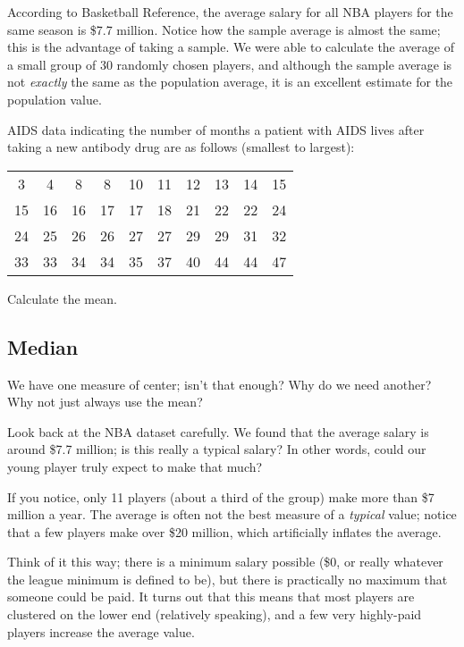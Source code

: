 According to Basketball Reference, the average salary for all NBA players for the same season is \$7.7 million.  Notice how the sample average is almost the same; this is the advantage of taking a sample.  We were able to calculate the average of a small group of 30 randomly chosen players, and although the sample average is not \emph{exactly} the same as the population average, it is an excellent estimate for the population value.

\begin{try}
AIDS data indicating the number of months a patient with AIDS lives after taking a new antibody drug are as follows (smallest to largest):
\begin{center}
\begin{tabular}{c c c c c c c c c c}
3 & 4 & 8 & 8 & 10 & 11 & 12 & 13 & 14 & 15\\
15 & 16 & 16 & 17 & 17 & 18 & 21 & 22 & 22 & 24\\
24 & 25 & 26 & 26 & 27 & 27 & 29 & 29 & 31 & 32\\
33 & 33 & 34 & 34 & 35 & 37 & 40 & 44 & 44 & 47\\
\end{tabular}
\end{center}
Calculate the mean.
\end{try}

\subsection{Median}
We have one measure of center; isn't that enough?  Why do we need another?  Why not just always use the mean?

Look back at the NBA dataset carefully.  We found that the average salary is around \$7.7 million; is this really a typical salary?  In other words, could our young player truly expect to make that much?

If you notice, only 11 players (about a third of the group) make more than \$7 million a year.  The average is often not the best measure of a \emph{typical} value; notice that a few players make over \$20 million, which artificially inflates the average.

Think of it this way; there is a minimum salary possible (\$0, or really whatever the league minimum is defined to be), but there is practically no maximum that someone could be paid.  It turns out that this means that most players are clustered on the lower end (relatively speaking), and a few very highly-paid players increase the average value.

